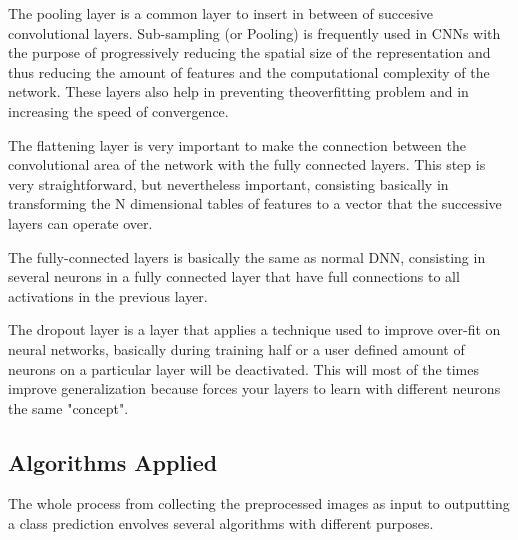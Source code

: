 \documentclass[10pt]{IEEEtran}
\begin{document}
The pooling layer is a common layer to insert in between of succesive convolutional layers.
Sub-sampling (or Pooling) is frequently used in CNNs with the purpose of progressively reducing the spatial size of the representation and thus reducing the amount of features and the computational complexity of the network.
These layers also help in preventing theoverfitting problem and in increasing the speed of convergence.

The flattening layer is very important to make the connection between the convolutional area of the network with the fully connected layers. 
This step is very straightforward, but nevertheless important, consisting basically in transforming the N dimensional tables of features to a vector that the successive layers can operate over.

The fully-connected layers is basically the same as normal DNN, consisting in several neurons in a fully connected layer that have full connections to all activations in the previous layer.

The dropout layer is a layer that applies a technique used to improve over-fit on neural networks, basically during training half or a user defined amount of neurons on a particular layer will be deactivated. This will most of the times improve generalization because forces your layers to learn with different neurons the same "concept".

\subsection{Algorithms Applied}

The whole process from collecting the preprocessed images as input to outputting a class prediction envolves several algorithms with different purposes.
\end{document}
